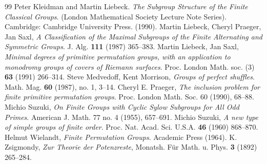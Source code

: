 \documentclass[12pt]{amsart}
\theoremstyle{remark}
\theoremstyle{definition}
\begin{document}
\begin{thebibliography}{99}
 Peter Kleidman and Martin Liebeck. \emph{The Subgroup Structure of the Finite Classical Groups}. (London Mathematical Society Lecture Note Series). Cambridge: Cambridge University Press. (1990).
 Martin Liebeck, Cheryl Praeger, Jan Saxl, \emph{A Classification of the Maximal Subgroups of the Finite Alternating and Symmetric Groups}.  J. Alg. \textbf{111}  (1987) 365--383.
 Martin Liebeck, Jan Saxl, \emph{Minimal degrees of primitive permutation groups, with an application to monodromy groups of covers of {R}iemann surfaces}.  Proc. London Math. soc. (3) \textbf{63} (1991) 266--314.
 Steve Medvedoff,  Kent Morrison, \emph{Groups of perfect shuffles}.  Math. Mag. \textbf{60} (1987), no. 1, 3--14.
 Cheryl E. Praeger, \emph{The inclusion problem for finite primitive permutation groups}. Proc. London Math. Soc. 60 (1990), 68--88.
 Michio Suzuki, \emph{On Finite Groups with Cyclic Sylow Subgroups for All Odd Primes}. American J. Math. 77 no. 4 (1955), 657--691.
 Michio Suzuki, \emph{A new type of simple groups of finite order}. Proc. Nat. Acad. Sci. U.S.A. \textbf{46} (1960) 868--870.
 Helmut Wielandt, \emph{Finite Permutation Groups}. Academic Press (1964).
 K. Zsigmondy, \emph{Zur Theorie der Potenzreste}, Monatsh. F\"{u}r Math. u. Phys. \textbf{3} (1892) 265--284.
\end{thebibliography}
\end{document}
